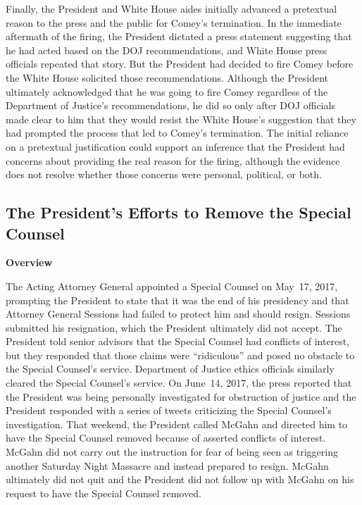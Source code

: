 Finally, the President and White House aides initially advanced a pretextual reason to the press and the public for Comey's termination.
In the immediate aftermath of the firing, the President dictated a press statement suggesting that he had acted based on the DOJ recommendations, and White House press officials repeated that story.
But the President had decided to fire Comey before the White House solicited those recommendations.
Although the President ultimately acknowledged that he was going to fire Comey regardless of the Department of Justice's recommendations, he did so only after DOJ officials made clear to him that they would resist the White House's suggestion that they had prompted the process that led to Comey's termination.
The initial reliance on a pretextual justification could support an inference that the President had concerns about providing the real reason for the firing, although the evidence does not resolve whether those concerns were personal, political, or both.

\subsection{The President's Efforts to Remove the Special Counsel}

\begin{center}
\textbf{Overview}
\end{center}

The Acting Attorney General appointed a Special Counsel on May~17, 2017, prompting the President to state that it was the end of his presidency and that Attorney General Sessions had failed to protect him and should resign.
Sessions submitted his resignation, which the President ultimately did not accept.
The President told senior advisors that the Special Counsel had conflicts of interest, but they responded that those claims were ``ridiculous'' and posed no obstacle to the Special Counsel's service.
Department of Justice ethics officials similarly cleared the Special Counsel's service.
On June~14, 2017, the press reported that the President was being personally investigated for obstruction of justice and the President responded with a series of tweets criticizing the Special Counsel's investigation.
That weekend, the President called McGahn and directed him to have the Special Counsel removed because of asserted conflicts of interest.
McGahn did not carry out the instruction for fear of being seen as triggering another Saturday Night Massacre and instead prepared to resign.
McGahn ultimately did not quit and the President did not follow up with McGahn on his request to have the Special Counsel removed.

